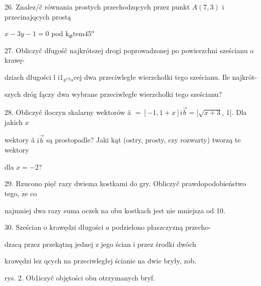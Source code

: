 \documentclass[a4paper,12pt]{article}
\begin{document}
26. Znalez/č równania prostych przechodzqcych przez punkt $A(7,3)$ i przecinajqcych prostą

$x-3y-1=0$ pod $\mathrm{k}_{\Phi}\mathrm{t}\mathrm{e}\mathrm{m}45^{\mathrm{o}}$

27. Obliczyč dfugośč najkrótszej drogi poprowadzonej po powierzchni sześcianu o krawę-

dziach długości l $\mathrm{i}1_{\text{ą}^{\mathrm{C}\mathrm{Z}}\mathrm{a}}\mathrm{c}\mathrm{e}\mathrm{j}$ dwa przeciwległe wierzchołki tego sześcianu. Ile najkrót-

szych dróg fączy dwa wybrane przeciwlegfe wierzcholki tego sześcianu?

28. Obliczyč iloczyn skalarny wektorów ã $= [-1,1+x] \mathrm{i} \vec{b}= [\sqrt{x+3}$, 1$]$. Dla jakich $x$

wektory ã $\mathrm{i}\vec{b}$ są prostopadle? Jaki kąt (ostry, prosty, czy rozwarty) tworzą te wektory

dla $x=-2$?

29. Rzucono pięč razy dwiema kostkami do gry. Obliczyč prawdopodobieństwo tego, $\dot{\mathrm{z}}\mathrm{e}$ co

najmniej dwa razy suma oczek na obu kostkach jest nie mniejsza od 10.

30. Sześcian o krawędzi długości $a$ podzielono płaszczyzną przecho-

dzacą przez przekątną jednej z jego ścian i przez środki dwóch

krawędzi $\mathrm{l}\mathrm{e}\dot{\mathrm{z}}$ qcych na przeciwległej ścianie na dwie bryły, zob.

rys. 2. Ob1iczyč objętości obu otrzymanych bryf.
\end{document}
